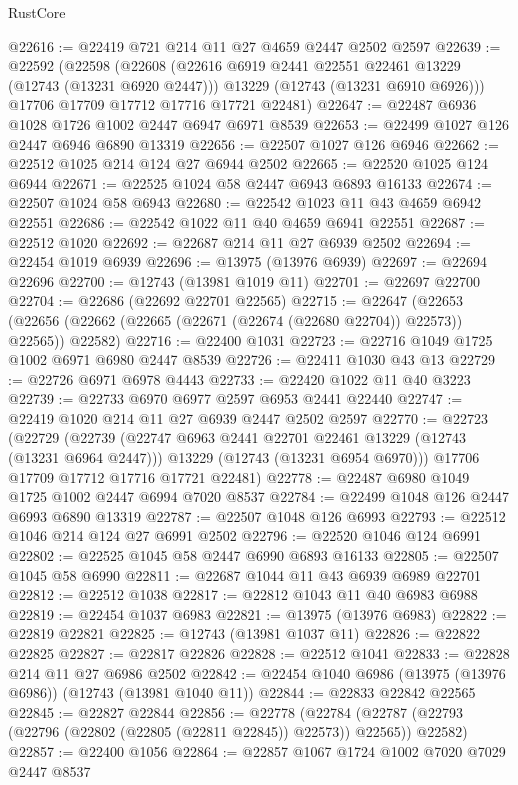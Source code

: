 \begin{lexlean}{RustCore}
\begin{coremodule}
@22616 := @22419 @721 @214 @11 @27 @4659 @2447 @2502 @2597
@22639 := @22592
    (@22598
      (@22608
        (@22616 @6919 @2441 @22551 @22461 @13229 (@12743 (@13231 @6920 @2447)))
        @13229
        (@12743 (@13231 @6910 @6926)))
      @17706
      @17709
      @17712
      @17716
      @17721
      @22481)
@22647 := @22487 @6936 @1028 @1726 @1002 @2447 @6947 @6971 @8539
@22653 := @22499 @1027 @126 @2447 @6946 @6890 @13319
@22656 := @22507 @1027 @126 @6946
@22662 := @22512 @1025 @214 @124 @27 @6944 @2502
@22665 := @22520 @1025 @124 @6944
@22671 := @22525 @1024 @58 @2447 @6943 @6893 @16133
@22674 := @22507 @1024 @58 @6943
@22680 := @22542 @1023 @11 @43 @4659 @6942 @22551
@22686 := @22542 @1022 @11 @40 @4659 @6941 @22551
@22687 := @22512 @1020
@22692 := @22687 @214 @11 @27 @6939 @2502
@22694 := @22454 @1019 @6939
@22696 := @13975 (@13976 @6939)
@22697 := @22694 @22696
@22700 := @12743 (@13981 @1019 @11)
@22701 := @22697 @22700
@22704 := @22686 (@22692 @22701 @22565)
@22715 := @22647
    (@22653 (@22656 (@22662 (@22665 (@22671 (@22674 (@22680 @22704)) @22573)) @22565)) @22582)
@22716 := @22400 @1031
@22723 := @22716 @1049 @1725 @1002 @6971 @6980 @2447 @8539
@22726 := @22411 @1030 @43 @13
@22729 := @22726 @6971 @6978 @4443
@22733 := @22420 @1022 @11 @40 @3223
@22739 := @22733 @6970 @6977 @2597 @6953 @2441 @22440
@22747 := @22419 @1020 @214 @11 @27 @6939 @2447 @2502 @2597
@22770 := @22723
    (@22729
      (@22739
        (@22747 @6963 @2441 @22701 @22461 @13229 (@12743 (@13231 @6964 @2447)))
        @13229
        (@12743 (@13231 @6954 @6970)))
      @17706
      @17709
      @17712
      @17716
      @17721
      @22481)
@22778 := @22487 @6980 @1049 @1725 @1002 @2447 @6994 @7020 @8537
@22784 := @22499 @1048 @126 @2447 @6993 @6890 @13319
@22787 := @22507 @1048 @126 @6993
@22793 := @22512 @1046 @214 @124 @27 @6991 @2502
@22796 := @22520 @1046 @124 @6991
@22802 := @22525 @1045 @58 @2447 @6990 @6893 @16133
@22805 := @22507 @1045 @58 @6990
@22811 := @22687 @1044 @11 @43 @6939 @6989 @22701
@22812 := @22512 @1038
@22817 := @22812 @1043 @11 @40 @6983 @6988
@22819 := @22454 @1037 @6983
@22821 := @13975 (@13976 @6983)
@22822 := @22819 @22821
@22825 := @12743 (@13981 @1037 @11)
@22826 := @22822 @22825
@22827 := @22817 @22826
@22828 := @22512 @1041
@22833 := @22828 @214 @11 @27 @6986 @2502
@22842 := @22454 @1040 @6986 (@13975 (@13976 @6986)) (@12743 (@13981 @1040 @11))
@22844 := @22833 @22842 @22565
@22845 := @22827 @22844
@22856 := @22778
    (@22784 (@22787 (@22793 (@22796 (@22802 (@22805 (@22811 @22845)) @22573)) @22565)) @22582)
@22857 := @22400 @1056
@22864 := @22857 @1067 @1724 @1002 @7020 @7029 @2447 @8537

\end{coremodule}
\end{lexlean}
